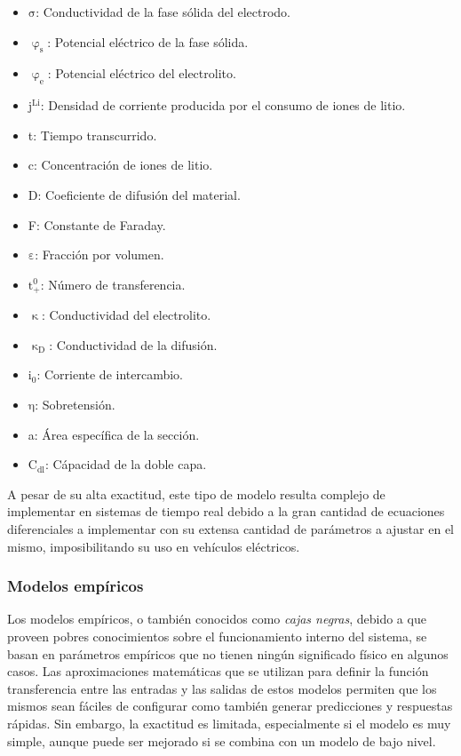 \documentclass[10pt,a4paper]{article}
\begin{document}
\begin{itemize}
    \item $\mathrm{\sigma}$: Conductividad de la fase s\'olida del
        electrodo.
    \item $\mathrm{\upvarphi_s}$: Potencial el\'ectrico de la fase
        s\'olida.
    \item $\mathrm{\upvarphi_e}$: Potencial el\'ectrico del
        electrolito.
    \item $\mathrm{j^{Li}}$: Densidad de corriente producida por el
        consumo de iones de litio.
    \item t: Tiempo transcurrido.
    \item c: Concentraci\'on de iones de litio.
    \item D: Coeficiente de difusi\'on del material.
    \item F: Constante de Faraday.
    \item $\mathrm{\varepsilon}$: Fracci\'on por volumen.
    \item $\mathrm{t_+^0}$: N\'umero de transferencia.
    \item $\mathrm{\upkappa}$: Conductividad del electrolito.
    \item $\mathrm{\upkappa_D}$: Conductividad de la difusi\'on.
    \item $\mathrm{i_0}$: Corriente de intercambio.
    \item $\mathrm{\eta}$: Sobretensi\'on.
    \item a: \'Area espec\'ifica de la secci\'on.
    \item $\mathrm{C_{dl}}$: C\'apacidad de la doble capa.
\end{itemize}

A pesar de su alta exactitud, este tipo de modelo resulta complejo de
implementar en sistemas de tiempo real debido a la gran cantidad de ecuaciones
diferenciales a implementar con su extensa cantidad de par\'ametros a ajustar en
el mismo, imposibilitando su uso en veh\'iculos el\'ectricos.

\subsubsection{Modelos emp\'iricos}\label{empModels}

\noindent Los modelos emp\'iricos, o tambi\'en conocidos como 
\emph{cajas negras}, debido a que proveen pobres conocimientos sobre el 
funcionamiento interno del sistema, se basan en par\'ametros emp\'iricos que no 
tienen ning\'un significado f\'isico en algunos casos. 
Las aproximaciones matem\'aticas que se utilizan para definir la
funci\'on transferencia entre las entradas y las salidas de estos modelos
permiten que los mismos sean f\'aciles de configurar como tambi\'en generar
predicciones y respuestas r\'apidas. Sin embargo, la exactitud es limitada,
especialmente si el modelo es muy simple, aunque puede ser mejorado si se combina
con un modelo de bajo nivel.
\end{document}
